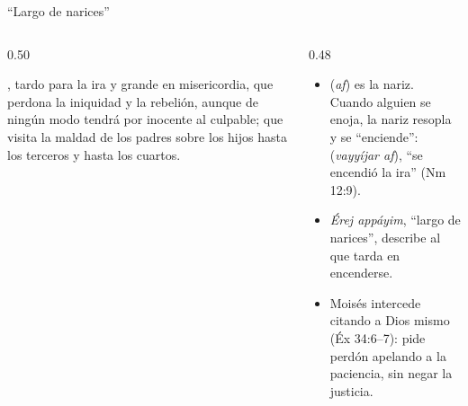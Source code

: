 \begin{frame}{``Largo de narices''}
\begin{columns}[t,onlytextwidth]
\begin{column}{0.50\textwidth}
\begin{cita}\SENOR, tardo para la ira y grande en misericordia, que perdona la iniquidad y la rebelión, aunque de ningún modo tendrá por inocente al culpable; que visita la maldad de los padres sobre los hijos hasta los terceros y hasta los cuartos.\end{cita}
\begin{center}\end{center}
\end{column}
\begin{column}{0.48\textwidth}\small
\begin{itemize}
\item {} (\emph{af}) es la nariz. Cuando alguien se enoja, la nariz resopla y se ``enciende'':  (\emph{vayyíjar af}), ``se encendió la ira'' (Nm 12:9).
\item \emph{Érej appáyim}, ``largo de narices'', describe al que tarda en encenderse.
\item Moisés intercede citando a Dios mismo (Éx 34:6--7): pide perdón apelando a la paciencia, sin negar la justicia.
\end{itemize}
\end{column}
\end{columns}
\end{frame}

